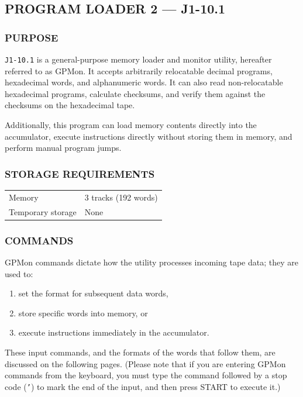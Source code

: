 \subsection*{PROGRAM LOADER 2 --- J1-10.1}
\label{sec:interactive-monitor}

\subsubsection*{PURPOSE}
\texttt{J1-10.1} is a general-purpose memory loader and monitor utility, hereafter referred to as GPMon. It accepts arbitrarily relocatable decimal programs, hexadecimal words, and alphanumeric words. It can also read non-relocatable hexadecimal programs, calculate checksums, and verify them against the checksums on the hexadecimal tape. 

Additionally, this program can load memory contents directly into the accumulator, execute instructions directly without storing them in memory, and perform manual program jumps.

\subsubsection*{STORAGE REQUIREMENTS}
\begin{center}
\begin{tabular}{ll}
    \toprule
    Memory & 3 tracks (192 words) \\
    Temporary storage    & None \\
    \bottomrule
\end{tabular}
\end{center}

\subsubsection*{COMMANDS}
GPMon commands dictate how the utility processes incoming tape data; they are used to:
\begin{enumerate}[label=\alph*)]
    \item set the format for subsequent data words,
    \item store specific words into memory, or
    \item execute instructions immediately in the accumulator.
\end{enumerate}

These input commands, and the formats of the words that follow them, are discussed on the following pages. (Please note that if you are entering GPMon commands from the keyboard, you must type the command followed by a stop code (\texttt{'}) to mark the end of the input, and then press \textsf{START} to execute it.)

